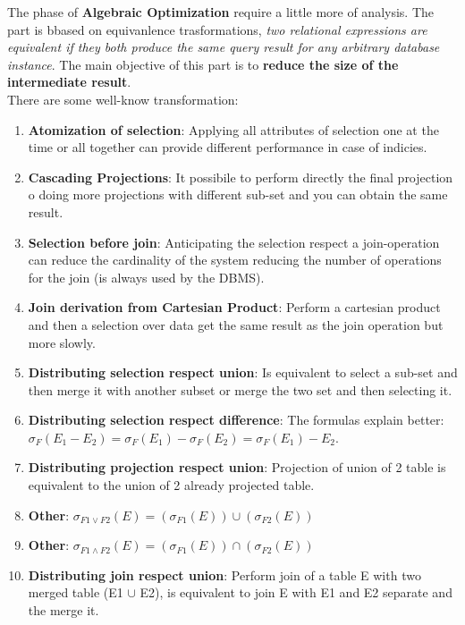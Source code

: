 \documentclass[12pt]{article}
\begin{document}
The phase of \textbf{Algebraic Optimization} require a little more of analysis. The part is bbased on equivanlence trasformations, \textit{two relational expressions are equivalent if they both produce the same query result for any arbitrary database instance}. The main objective of this part is to \textbf{reduce the size of the intermediate result}.\\
There are some well-know transformation:
\begin{enumerate}
  \item \textbf{Atomization of selection}: Applying all attributes of selection one at the time or all together can provide different performance in case of indicies.
  \item \textbf{Cascading Projections}: It possibile to perform directly the final projection o doing more projections with different sub-set and you can obtain the same result.
  \item \textbf{Selection before join}: Anticipating the selection respect a join-operation can reduce the cardinality of the system reducing the number of operations for the join (is always used by the DBMS).
  \item \textbf{Join derivation from Cartesian Product}: Perform a cartesian product and then a selection over data get the same result as the join operation but more slowly.
  \item \textbf{Distributing selection respect union}: Is equivalent to select a sub-set and then merge it with another subset or merge the two set and then selecting it.
  \item \textbf{Distributing selection respect difference}: The formulas explain better: $\sigma_{F}(E_1 - E_2) = \sigma_{F}(E_1) - \sigma_{F}(E_2) = \sigma_{F}(E_1) - E_2 $.
  \item \textbf{Distributing projection respect union}: Projection of union of 2 table is equivalent to the union of 2 already projected table.
  \item \textbf{Other}: $\sigma_{F1 \vee F2}(E) = (\sigma_{F1}(E)) \cup (\sigma_{F2}(E))$
  \item \textbf{Other}: $\sigma_{F1 \wedge F2}(E) = (\sigma_{F1}(E)) \cap (\sigma_{F2}(E))$
  \item \textbf{Distributing join respect union}: Perform join of a table E with two merged table (E1 $\cup$ E2), is equivalent to join E with E1 and E2 separate and the merge it.
\end{enumerate}
\end{document}
